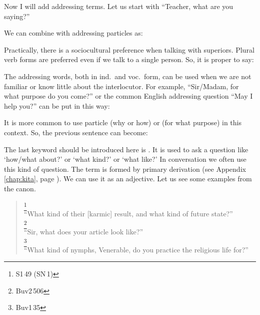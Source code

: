 Now I will add addressing terms. Let us start with ``Teacher, what are you saying?''


We can combine with addressing particles as:


Practically, there is a sociocultural preference when talking with superiors. Plural verb forms are preferred even if we talk to a single person. So, it is proper to say:


The addressing words, both in ind.\ and voc.\ form, can be used when we are not familiar or know little about the interlocutor. For example, ``Sir/Madam, for what purpose do you come?'' or the common English addressing question ``May I help you?'' can be put in this way:


It is more common to use particle  (why or how) or  (for what purpose) in this context. So, the previous sentence can become:


The last keyword should be introduced here is . It is used to ask a question like `how/what about?' or `what kind?' or `what like?' In conversation we often use this kind of question. The term is formed by primary derivation (see Appendix \ref{chap:kita}, page \pageref{par:kiidisa}). We can use it as an adjective. Let us see some examples from the canon.

\begin{quote}
\footnote{S1\,49 (SN\,1)}\\
``What kind of their [karmic] result, and what kind of future state?''\\[1.5mm]
\footnote{Buv2\,506}\\
``Sir, what does your article look like?''\\[1.5mm]
\footnote{Buv1\,35}\\
``What kind of nymphs, Venerable, do you practice the religious life for?''\\[1.5mm]
\end{quote}

